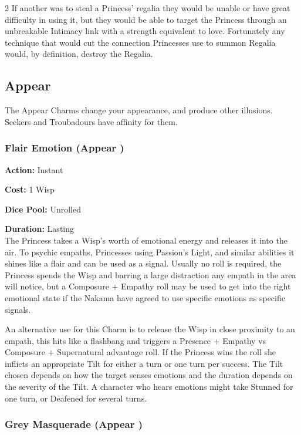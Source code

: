 \begin{multicols}{2}
If another was to steal a Princess' regalia they would be unable or have great difficulty in using it, but they would be able to target the Princess through an unbreakable Intimacy link with a strength equivalent to love. Fortunately any technique that would cut the connection Princesses use to summon Regalia would, by definition, destroy the Regalia.  


\subsection*{Appear}
\label{subsec:Appear}

The Appear Charms change your appearance, and produce other illusions. Seekers and Troubadours have affinity for them. 

\subsubsection*{Flair Emotion (Appear \textbullet)}

\noindent \textbf{Action:} Instant 

\noindent \textbf{Cost:} 1 Wisp 

\noindent \textbf{Dice Pool:} Unrolled 

\noindent \textbf{Duration:} Lasting \\

\noindent The Princess takes a Wisp's worth of emotional energy and releases it into the air. To psychic empaths, Princesses using Passion’s Light, and similar abilities it shines like a flair and can be used as a signal. Usually no roll is required, the Princess spends the Wisp and barring a large distraction any empath in the area will notice, but a Composure + Empathy roll may be used to get into the right emotional state if the Nakama have agreed to use specific emotions as specific signals. 

An alternative use for this Charm is to release the Wisp in close proximity to an empath, this hits like a flashbang and triggers a Presence + Empathy vs Composure + Supernatural advantage roll. If the Princess wins the roll she inflicts an appropriate Tilt for either a turn or one turn per success. The Tilt chosen depends on how the target senses emotions and the duration depends on the severity of the Tilt. A character who hears emotions might take Stunned for one turn, or Deafened for several turns. 


\subsubsection*{Grey Masquerade (Appear \textbullet)}


\end{multicols}
